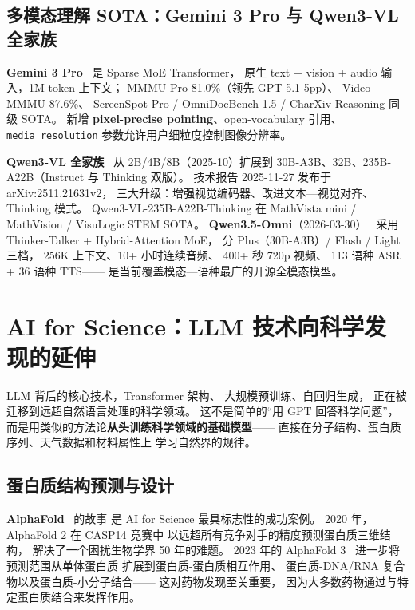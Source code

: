 \subsection{多模态理解 SOTA：Gemini 3 Pro 与 Qwen3-VL 全家族}

\textbf{Gemini 3 Pro}~\cite{gemini3_pro_multimodal_2026}
是 Sparse MoE Transformer，
原生 text + vision + audio 输入，1M token 上下文；
MMMU-Pro 81.0\%（领先 GPT-5.1 5pp）、
Video-MMMU 87.6\%、
ScreenSpot-Pro / OmniDocBench 1.5 / CharXiv Reasoning 同级 SOTA。
新增 \textbf{pixel-precise pointing}、open-vocabulary 引用、
\texttt{media\_resolution} 参数允许用户细粒度控制图像分辨率。

\textbf{Qwen3-VL 全家族}~\cite{qwen3_vl_2025}
从 2B/4B/8B（2025-10）扩展到
30B-A3B、32B、235B-A22B（Instruct 与 Thinking 双版）。
技术报告 2025-11-27 发布于 arXiv:2511.21631v2，
三大升级：增强视觉编码器、改进文本—视觉对齐、Thinking 模式。
Qwen3-VL-235B-A22B-Thinking 在 MathVista mini / MathVision / VisuLogic
STEM SOTA。
\textbf{Qwen3.5-Omni}（2026-03-30）~\cite{qwen35_omni_2026}
采用 Thinker-Talker + Hybrid-Attention MoE，
分 Plus（30B-A3B）/ Flash / Light 三档，
256K 上下文、10+ 小时连续音频、
400+ 秒 720p 视频、
113 语种 ASR + 36 语种 TTS——
是当前覆盖模态—语种最广的开源全模态模型。

\section{AI for Science：LLM 技术向科学发现的延伸}
\label{sec:ai-for-science}

LLM 背后的核心技术，Transformer 架构、
大规模预训练、自回归生成，
正在被迁移到远超自然语言处理的科学领域。
这不是简单的“用 GPT 回答科学问题”，
而是用类似的方法论\textbf{从头训练科学领域的基础模型}——
直接在分子结构、蛋白质序列、天气数据和材料属性上
学习自然界的规律。

\subsection{蛋白质结构预测与设计}

\textbf{AlphaFold}~\cite{jumper2021alphafold} 的故事
是 AI for Science 最具标志性的成功案例。
2020 年，AlphaFold 2 在 CASP14 竞赛中
以远超所有竞争对手的精度预测蛋白质三维结构，
解决了一个困扰生物学界 50 年的难题。
2023 年的 AlphaFold 3~\cite{abramson2024alphafold3}
进一步将预测范围从单体蛋白质
扩展到蛋白质-蛋白质相互作用、
蛋白质-DNA/RNA 复合物以及蛋白质-小分子结合——
这对药物发现至关重要，
因为大多数药物通过与特定蛋白质结合来发挥作用。

